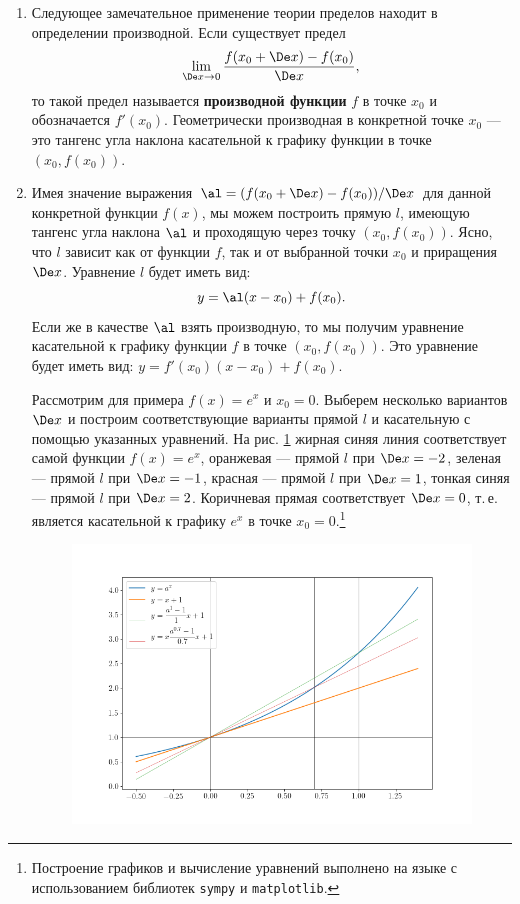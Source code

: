 \begin{enumerate}
\item Следующее замечательное применение теории пределов находит в определении производной. Если существует предел
$$
\lim_{\De x\to 0}\frac{f(x_0+\De x)-f(x_0)}{\De x},
$$
то такой предел называется \textbf{производной функции} $f$ в точке $x_0$ и обозначается $f'(x_0)$. Геометрически производная в конкретной точке $x_0$ --- это тангенс угла наклона касательной к графику функции в точке $(x_0,f(x_0))$.

\item Имея значение выражения $\al=(f(x_0+\De x)-f(x_0))/\De x$ для данной конкретной функции $f(x)$, мы можем построить прямую $l$, имеющую тангенс угла наклона $\al$ и проходящую через точку $(x_0,f(x_0))$. Ясно, что $l$ зависит как от функции $f$, так и от выбранной точки $x_0$ и приращения $\De x$. Уравнение $l$ будет иметь вид:
$$
y = \al(x-x_0)+f(x_0).
$$
Если же в качестве $\al$ взять производную, то мы получим уравнение касательной к графику функции $f$ в точке $(x_0,f(x_0))$. Это уравнение будет иметь вид: $y=f'(x_0)(x-x_0)+f(x_0)$.

Рассмотрим для примера $f(x)=e^x$ и $x_0=0$. Выберем несколько вариантов $\De x$ и построим соответствующие варианты прямой $l$ и касательную с помощью указанных уравнений. На рис.
\ref{deriv} жирная синяя линия соответствует самой функции $f(x)=e^x$, оранжевая --- прямой $l$ при $\De x=-2$, зеленая --- прямой $l$ при $\De x=-1$, красная --- прямой $l$ при $\De x=1$, тонкая синяя --- прямой $l$ при $\De x=2$. Коричневая прямая соответствует $\De x=0$, т.\,е. является касательной к графику $e^x$ в точке $x_0=0$.\footnote{Построение графиков и вычисление уравнений выполнено на языке \Python{} с использованием библиотек \texttt{sympy} и \texttt{matplotlib}.}

\begin{figure}[hbt!]
\hspace{-14mm}\includegraphics[scale=0.5]{deriv.png}
\caption{}\label{deriv}
\end{figure}


\end{enumerate}
